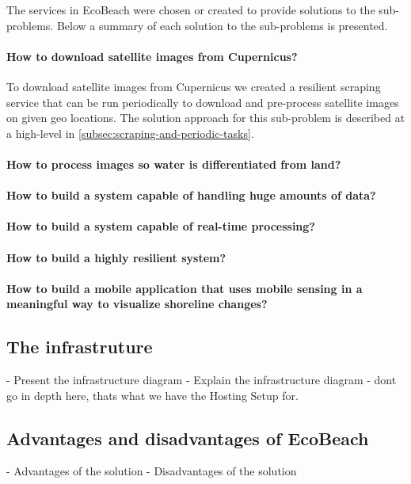 \noindent
The services in EcoBeach were chosen or created to provide solutions to the sub-problems. Below a summary of each solution to the sub-problems is presented.

\paragraph{How to download satellite images from Cupernicus?} To download satellite images from Cupernicus we created a resilient scraping service that can be run periodically to download and pre-process satellite images on given geo locations. The solution approach for this sub-problem is described at a high-level in \autoref{subsec:scraping-and-periodic-tasks}.
\paragraph{How to process images so water is differentiated from land?}
\paragraph{How to build a system capable of handling huge amounts of data?}
\paragraph{How to build a system capable of real-time processing?}
\paragraph{How to build a highly resilient system?}
\paragraph{How to build a mobile application that uses mobile sensing in a meaningful way to visualize shoreline changes?}

\subsection{The infrastruture}
- Present the infrastructure diagram
- Explain the infrastructure diagram
- dont go in depth here, thats what we have the Hosting Setup for.

\subsection{Advantages and disadvantages of EcoBeach}
- Advantages of the solution
- Disadvantages of the solution

